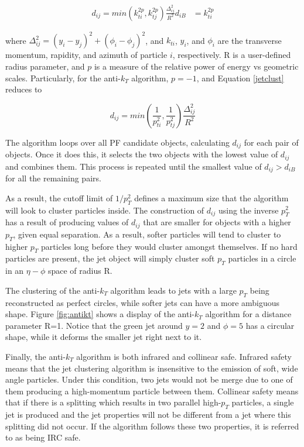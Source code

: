  \begin{align}
 \label{jetclust}
 d_{ij} = min(k_{ti}^{2p},k_{tj}^{2p})\frac{\Delta_{ij}^{2}}{R^{2}}
 d_{iB} &= k_{ti}^{2p}
 \end{align}

where $\Delta_{ij}^{2} = (y_{i}-y_{j})^{2}+(\phi_{i}-\phi_{j})^{2}$, and $k_{ti}$, $y_{i}$, and $\phi_{i}$ are the transverse momentum, rapidity, and azimuth of particle $i$, respectively. R is a user-defined radius parameter, and $p$ is a measure of the relative power of energy vs geometric scales. Particularly, for the anti-$k_{T}$ algorithm, $p=-1$, and Equation \ref{jetclust} reduces to

\begin{equation}
d_{ij} = min(\frac{1}{p_{ti}^{2}},\frac{1}{p_{tj}^{2}})\frac{\Delta_{ij}^{2}}{R^{2}}
\end{equation}

The algorithm loops over all PF candidate objects, calculating $d_{ij}$ for each pair of objects. Once it does this, it selects the two objects with the lowest value of $d_{ij}$ and combines them. This process is repeated until the smallest value of $d_{ij}>d_{iB}$ for all the remaining pairs. 

As a result, the cutoff limit of $1/p_{T}^{2}$ defines a maximum size that the algorithm will look to cluster particles inside. The construction of $d_{ij}$ using the inverse $p_{T}^{2}$ has a result of producing values of $d_{ij}$ that are smaller for objects with a higher $p_{T}$, given equal separation. As a result, softer particles will tend to cluster to higher $p_{T}$ particles long before they would cluster amongst themselves. If no hard particles are present, the jet object will simply cluster soft $p_{T}$ particles in a circle in an $\eta-\phi$ space of radius R.

The clustering of the anti-$k_{T}$ algorithm leads to jets with a large $p_{T}$ being reconstructed as perfect circles, while softer jets can have a more ambiguous shape. Figure \ref{fig:antikt} shows a display of the anti-$k_{T}$ algorithm for a distance parameter R=1. Notice that the green jet around $y=2$ and $\phi=5$ has a circular shape, while it deforms the smaller jet right next to it.

Finally, the anti-$k_{T}$ algorithm is both infrared and collinear safe. Infrared safety means that the jet clustering algorithm is insensitive to the emission of soft, wide angle particles. Under this condition, two jets would not be merge due to one of them producing a high-momentum particle between them. Collinear safety means that if there is a splitting which results in two parallel high-$p_{T}$ particles, a single jet is produced and the jet properties will not be different from a jet where this splitting did not occur. If the algorithm follows these two properties, it is referred to as being IRC safe.

